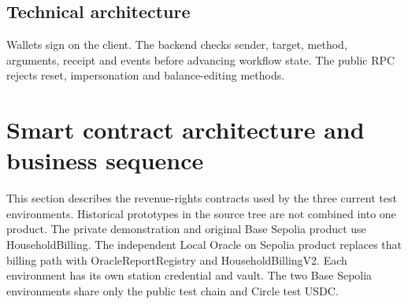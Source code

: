 \documentclass[12pt,a4paper]{article}
\begin{document}
\clearpage\begin{landscape}
\subsection{Technical architecture}
Wallets sign on the client. The backend checks sender, target, method, arguments, receipt and events before advancing workflow state. The public RPC rejects reset, impersonation and balance-editing methods.

\begin{center}\end{center}
\end{landscape}
\clearpage\section{Smart contract architecture and business sequence}
This section describes the revenue-rights contracts used by the three current test environments. Historical prototypes in the source tree are not combined into one product. The private demonstration and original Base Sepolia product use HouseholdBilling. The independent Local Oracle on Sepolia product replaces that billing path with OracleReportRegistry and HouseholdBillingV2. Each environment has its own station credential and vault. The two Base Sepolia environments share only the public test chain and Circle test USDC.
\end{document}

